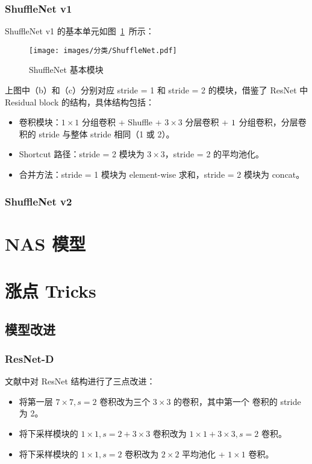 \subsection{ShuffleNet v1}
ShuffleNet v1 的基本单元如图~\ref{fig:shufflenet}~所示：

\begin{figure}[ht]
  \centering
  \texttt{[image: images/分类/ShuffleNet.pdf]}
  \caption{ShuffleNet 基本模块}
  \label{fig:shufflenet}
\end{figure}

上图中（b）和（c）分别对应 stride = 1 和 stride = 2 的模块，借鉴了 ResNet 中
Residual block 的结构，具体结构包括：

\begin{itemize}
  \item 卷积模块：$1 \times 1$ 分组卷积 + Shuffle + $3 \times 3$ 分层卷积 + $1
    \time 1$ 分组卷积，分层卷积的 stride 与整体 stride 相同（1 或 2）。
  \item Shortcut 路径：stride = 2 模块为 $3 \times 3$，stride = 2 的平均池化。
  \item 合并方法：stride = 1 模块为 element-wise 求和，stride = 2 模块为 concat。
\end{itemize}

\subsection{ShuffleNet v2}

\chapter{NAS 模型}

\chapter{涨点 Tricks}
\section{模型改进}
\subsection{ResNet-D}
文献中对 ResNet 结构进行了三点改进：
\begin{itemize}
  \item 将第一层 $7 \times 7, s=2$ 卷积改为三个 $3 \times 3$ 的卷积，其中第一个
    卷积的 stride 为 2。
  \item 将下采样模块的 $1 \times 1, s=2 + 3 \times 3$ 卷积改为 $1 \times 1 + 3
    \times 3, s=2$ 卷积。
  \item 将下采样模块的 $1 \times 1, s=2$ 卷积改为 $2 \times 2$ 平均池化 + $1
    \times 1$ 卷积。
\end{itemize}

